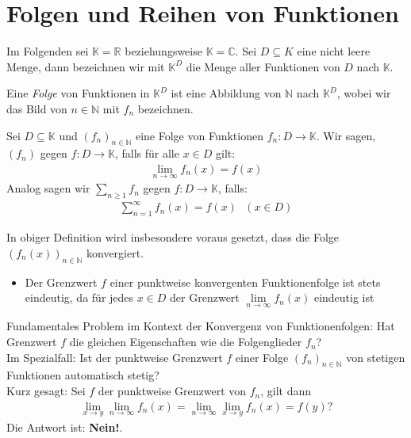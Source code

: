 \cleardoublepage
\section{Folgen und Reihen von Funktionen}
Im Folgenden sei $\mathbb{K} = \mathbb{R}$ beziehungsweise $\mathbb{K} = \mathbb{C}$. Sei $D \subseteq K$ eine nicht leere Menge, dann bezeichnen wir mit $\mathbb{K}^D $ die Menge aller Funktionen von $D$ nach $\mathbb{K}$.

Eine \emph{Folge} von Funktionen in $\mathbb{K}^D$ ist eine Abbildung von $\mathbb{N}$ nach $\mathbb{K}^D$, wobei wir das Bild von $n \in \mathbb{N}$ mit 
$f_n$ bezeichnen.

\begin{Definition}{
	Sei $D \subseteq \mathbb{K}$ und $(f_n)_{n \in \mathbb{N}}$ eine Folge von 
	Funktionen $f_n : D \rightarrow \mathbb{K}$. Wir sagen, $(f_n)$  gegen $f:D \rightarrow \mathbb{K}$, falls für alle $x \in D$ gilt:
	\begin{align*}
		\lim \limits_{n \rightarrow \infty}{f_n(x) =f(x)}
	\end{align*}
	Analog sagen wir $\sum_{n\geq 1} f_n$  gegen 
	$f: D \rightarrow \mathbb{K}$, falls:
	\begin{align*}
		\sum_{n = 1}^{\infty} f_n(x) = f(x) \text{ } (x \in D)
	\end{align*}
}\end{Definition}

\begin{Bemerkung}{
	In obiger Definition wird insbesondere voraus gesetzt, dass die Folge $(f_n(x))_
	{n \in \mathbb{N}}$ konvergiert.
	\begin{itemize}
		\item Der Grenzwert $f$ einer punktweise konvergenten Funktionenfolge ist 
		stets eindeutig, da für jedes $x \in D$ der Grenzwert 
		$\lim\limits_{n \rightarrow \infty} f_n(x)$ eindeutig ist
	\end{itemize}
	Fundamentales Problem im Kontext der Konvergenz von Funktionenfolgen:
	\glqq Hat Grenzwert $f$ die \glqq gleichen\grqq{} Eigenschaften wie die 
	Folgenglieder $f_n$?\grqq{} \\
	Im Spezialfall: Ist der punktweise Grenzwert $f$ einer Folge $(f_n)_{n \in 
	\mathbb{N}}$ von stetigen Funktionen automatisch stetig? \\
	Kurz gesagt: Sei $f$ der punktweise Grenzwert von $f_n$, gilt dann 
	\begin{align*}
		\lim\limits_{x \rightarrow y}{\lim \limits_{n \rightarrow \infty}{f_n(x)}}
		= \lim\limits_{n \rightarrow \infty}{\lim\limits_{x \rightarrow y}{f_n(x)} }
		= f(y) ?
	\end{align*}
	Die Antwort ist: \textbf{Nein!}.
}\end{Bemerkung}

